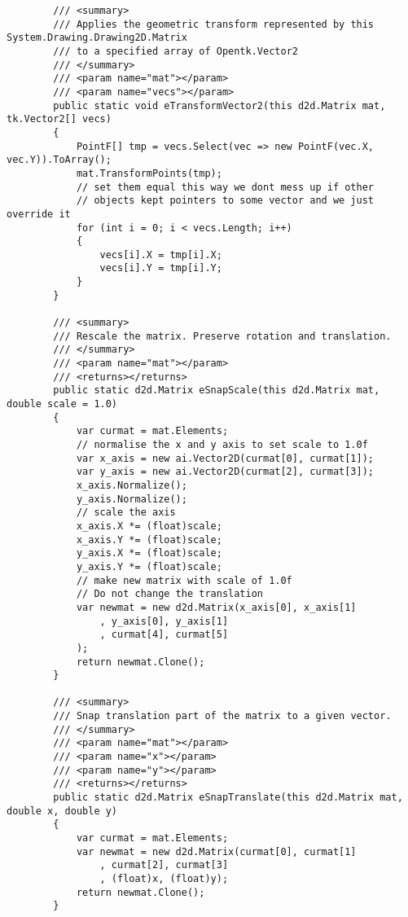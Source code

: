 \begin{scriptsize}
\begin{verbatim}
        /// <summary>
        /// Applies the geometric transform represented by this System.Drawing.Drawing2D.Matrix
        /// to a specified array of Opentk.Vector2
        /// </summary>
        /// <param name="mat"></param>
        /// <param name="vecs"></param>
        public static void eTransformVector2(this d2d.Matrix mat, tk.Vector2[] vecs)
        {
            PointF[] tmp = vecs.Select(vec => new PointF(vec.X, vec.Y)).ToArray();
            mat.TransformPoints(tmp);
            // set them equal this way we dont mess up if other 
            // objects kept pointers to some vector and we just override it
            for (int i = 0; i < vecs.Length; i++)
            {
                vecs[i].X = tmp[i].X;
                vecs[i].Y = tmp[i].Y;
            }
        }

        /// <summary>
        /// Rescale the matrix. Preserve rotation and translation.
        /// </summary>
        /// <param name="mat"></param>
        /// <returns></returns>
        public static d2d.Matrix eSnapScale(this d2d.Matrix mat, double scale = 1.0)
        {
            var curmat = mat.Elements;
            // normalise the x and y axis to set scale to 1.0f
            var x_axis = new ai.Vector2D(curmat[0], curmat[1]);
            var y_axis = new ai.Vector2D(curmat[2], curmat[3]);
            x_axis.Normalize();
            y_axis.Normalize();
            // scale the axis
            x_axis.X *= (float)scale;
            x_axis.Y *= (float)scale;
            y_axis.X *= (float)scale;
            y_axis.Y *= (float)scale;
            // make new matrix with scale of 1.0f 
            // Do not change the translation
            var newmat = new d2d.Matrix(x_axis[0], x_axis[1]
                , y_axis[0], y_axis[1]
                , curmat[4], curmat[5]
            );
            return newmat.Clone();
        }

        /// <summary>
        /// Snap translation part of the matrix to a given vector.
        /// </summary>
        /// <param name="mat"></param>
        /// <param name="x"></param>
        /// <param name="y"></param>
        /// <returns></returns>
        public static d2d.Matrix eSnapTranslate(this d2d.Matrix mat, double x, double y)
        {
            var curmat = mat.Elements;
            var newmat = new d2d.Matrix(curmat[0], curmat[1]
                , curmat[2], curmat[3]
                , (float)x, (float)y);
            return newmat.Clone();
        }


\end{verbatim}
\end{scriptsize}
